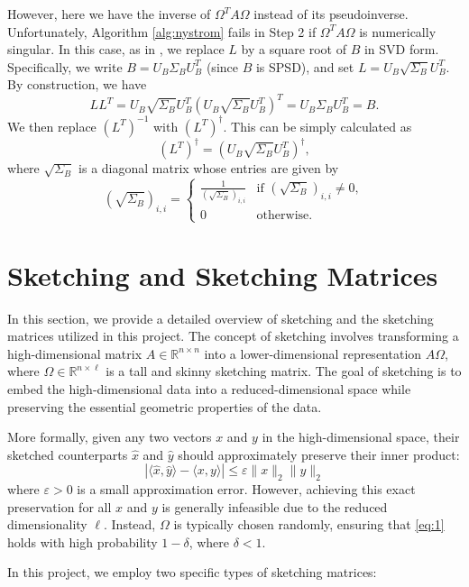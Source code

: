 \documentclass[a4paper, 12pt,oneside]{article}
\begin{document}
However, here we have the inverse of $\Omega^T A \Omega$ instead of its pseudoinverse. Unfortunately, Algorithm \ref{alg:nystrom} fails in Step 2 if $\Omega^T A \Omega$ is numerically singular. In this case, as in \cite{reference}, we replace $L$ by a square root of $B$ in SVD form. Specifically, we write $B = U_B \Sigma_B U_B^T$ (since $B$ is SPSD), and set $L = U_B \sqrt{\Sigma_B} U_B^T$. By construction, we have
\[
LL^T = U_B \sqrt{\Sigma_B} U_B^T (U_B \sqrt{\Sigma_B} U_B^T)^T = U_B \Sigma_B U_B^T = B.
\]
We then replace $(L^T)^{-1}$ with $(L^T)^\dagger$. This can be simply calculated as
\[
(L^T)^\dagger = (U_B \sqrt{\Sigma_B} U_B^T)^\dagger,
\]
where $\sqrt{\Sigma_B}$ is a diagonal matrix whose entries are given by
\[
(\sqrt{\Sigma_B})_{i,i} = \begin{cases} \frac{1}{(\sqrt{\Sigma_B})_{i,i}} & \text{if } (\sqrt{\Sigma_B})_{i,i} \neq 0, \\
0 & \text{otherwise.} \end{cases}
\]
\section{Sketching and Sketching Matrices}

In this section, we provide a detailed overview of sketching and the sketching matrices utilized in this project. The concept of sketching involves transforming a high-dimensional matrix $A \in \mathbb{R}^{n \times n}$ into a lower-dimensional representation $A\Omega$, where $\Omega \in \mathbb{R}^{n \times \ell}$ is a tall and skinny sketching matrix. The goal of sketching is to embed the high-dimensional data into a reduced-dimensional space while preserving the essential geometric properties of the data.

More formally, given any two vectors $x$ and $y$ in the high-dimensional space, their sketched counterparts $\hat{x}$ and $\hat{y}$ should approximately preserve their inner product:
\begin{equation}\label{eq:1}
\left| \langle \hat{x}, \hat{y} \rangle - \langle x, y \rangle \right| \leq \varepsilon \|x\|_2 \|y\|_2 \tag{2}
\end{equation}
where $\varepsilon > 0$ is a small approximation error. However, achieving this exact preservation for all $x$ and $y$ is generally infeasible due to the reduced dimensionality $\ell$. Instead, $\Omega$ is typically chosen randomly, ensuring that \cref{eq:1} holds with high probability $1 - \delta$, where $\delta < 1$.

In this project, we employ two specific types of sketching matrices:
\end{document}
